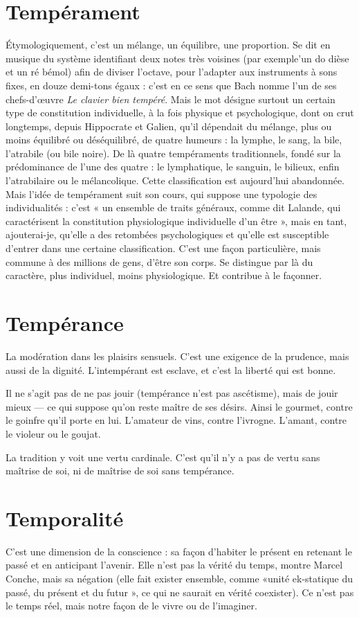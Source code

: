 \section{Tempérament}
Étymologiquement, c’est un mélange, un équilibre, une
proportion. Se dit en musique du système identifiant
deux notes très voisines (par exemple’un do dièse et un ré bémol) afin de
diviser l’octave, pour l’adapter aux instruments à sons fixes, en douze demi-tons
égaux : c’est en ce sens que Bach nomme l’un de ses chefs-d’œuvre {\it Le
clavier bien tempéré}. Mais le mot désigne surtout un certain type de constitution
individuelle, à la fois physique et psychologique, dont on crut longtemps,
depuis Hippocrate et Galien, qu’il dépendait du mélange, plus ou
moins équilibré ou déséquilibré, de quatre humeurs : la lymphe, le sang, la
bile, l’atrabile (ou bile noire). De là quatre tempéraments traditionnels,
fondé sur la prédominance de l’une des quatre : le lymphatique, le sanguin,
le bilieux, enfin l’atrabilaire ou le mélancolique. Cette classification est
aujourd’hui abandonnée. Mais l’idée de tempérament suit son cours, qui
suppose une typologie des individualités : c’est « un ensemble de traits généraux,
comme dit Lalande, qui caractérisent la constitution physiologique
individuelle d’un être », mais en tant, ajouterai-je, qu’elle a des retombées
psychologiques et qu’elle est susceptible d’entrer dans une certaine classification.
C’est une façon particulière, mais commune à des millions de gens,
d’être son corps. Se distingue par là du caractère, plus individuel, moins physiologique.
Et contribue à le façonner.

\section{Tempérance}
La modération dans les plaisirs sensuels. C’est une exigence
de la prudence, mais aussi de la dignité. L’intempérant est
esclave, et c’est la liberté qui est bonne.

Il ne s’agit pas de ne pas jouir (tempérance n’est pas ascétisme), mais de
jouir mieux — ce qui suppose qu’on reste maître de ses désirs. Ainsi le gourmet,
contre le goinfre qu’il porte en lui. L’amateur de vins, contre l’ivrogne.
L'amant, contre le violeur ou le goujat.

La tradition y voit une vertu cardinale. C’est qu’il n’y a pas de vertu sans
maîtrise de soi, ni de maîtrise de soi sans tempérance.

\section{Temporalité}
C’est une dimension de la conscience : sa façon d’habiter
le présent en retenant le passé et en anticipant l'avenir.
Elle n’est pas la vérité du temps, montre Marcel Conche, mais sa négation (elle
fait exister ensemble, comme «unité ek-statique du passé, du présent et du
futur », ce qui ne saurait en vérité coexister). Ce n’est pas le temps réel, mais
notre façon de le vivre ou de l’imaginer.

